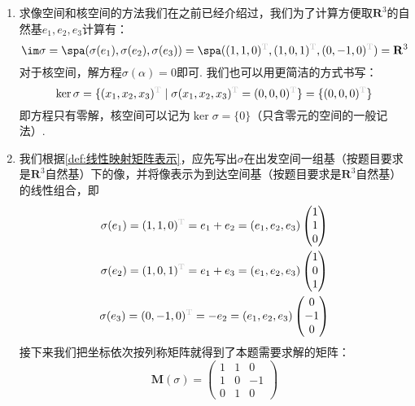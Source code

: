 \begin{solution}
    \begin{enumerate}
        \item 求像空间和核空间的方法我们在之前已经介绍过，我们为了计算方便取$\mathbf{R}^3$的自然基$e_1,e_2,e_3$计算有：
              \[
                \im\sigma
                =\spa(\sigma(e_1),\sigma(e_2),\sigma(e_3))
                =\spa(
                        (1,1,0)^{\color{lightgray}\mathrm{T}},
                        (1,0,1)^{\color{lightgray}\mathrm{T}},
                        (0,-1,0)^{\color{lightgray}\mathrm{T}}
                    )
                =\mathbf{R}^3
              \]
              对于核空间，解方程$\sigma(\alpha)=0$即可. 我们也可以用更简洁的方式书写：
              \[
                \ker\sigma
                =\{
                    (x_1,x_2,x_3)^{\color{lightgray}\mathrm{T}} \mid
                    \sigma(x_1,x_2,x_3)^{\color{lightgray}\mathrm{T}}
                    =(0,0,0)^{\color{lightgray}\mathrm{T}}
                \}
                =\{(0,0,0)^{\color{lightgray}\mathrm{T}}\}
              \]
              即方程只有零解，核空间可以记为$\ker\sigma=\{0\}$（只含零元的空间的一般记法）.

        \item 我们根据\autoref{def:线性映射矩阵表示}，应先写出$\sigma$在出发空间一组基（按题目要求是$\mathbf{R}^3$自然基）下的像，并将像表示为到达空间基（按题目要求是$\mathbf{R}^3$自然基）的线性组合，即
            \begin{gather*}
                \sigma(e_1) = (1,1,0)^{\color{lightgray}\mathrm{T}}
                =e_1+e_2=(e_1,e_2,e_3)\begin{pmatrix}
                    1 \\ 1 \\ 0
                \end{pmatrix} \\
                \sigma(e_2) = (1,0,1)^{\color{lightgray}\mathrm{T}}
                =e_1+e_3=(e_1,e_2,e_3)\begin{pmatrix}
                    1 \\ 0 \\ 1
                \end{pmatrix} \\
                \sigma(e_3) = (0,-1,0)^{\color{lightgray}\mathrm{T}}
                =-e_2=(e_1,e_2,e_3)\begin{pmatrix}
                    0 \\ -1 \\ 0
                \end{pmatrix}
            \end{gather*}
            接下来我们把坐标依次按列称矩阵就得到了本题需要求解的矩阵：
            \[
                \mathbf{M}(\sigma)=\begin{pmatrix}
                    1 & 1 & 0  \\
                    1 & 0 & -1 \\
                    0 & 1 & 0
                \end{pmatrix}
            \]
    \end{enumerate}
\end{solution}

